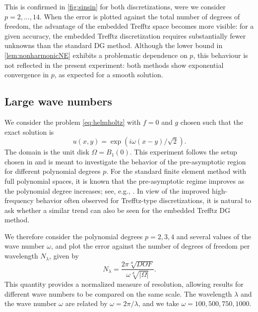 \documentclass[11pt]{article}
\theoremstyle{definition}
\theoremstyle{plain}
\begin{document}
This is confirmed in \cref{fig:sinsin} for both discretizations, were we consider $p=2,\ldots,14$.
When the error is plotted against the total number of degrees of freedom, the advantage of the embedded Trefftz space becomes more visible: for a given accuracy, the embedded Trefftz discretization requires substantially fewer unknowns than the standard DG method.
Although the lower bound in \cref{lem:nonharmonicNE} exhibits a problematic dependence on $p$, this behaviour is not reflected in the present experiment: both methods show exponential convergence in $p$, as expected for a smooth solution.


\subsection{Large wave numbers} \label{sec:largeo}
We consider the problem \eqref{eq:helmholtz} with $f=0$ and $g$ chosen such that the exact solution is 
\begin{equation}\label{eq:exp}
    u(x,y) = \exp(i\omega (x-y)/\sqrt{2}).
\end{equation}
The domain is the unit disk $\Omega = B_1(0)$.
This experiment follows the setup chosen in \cite{BM19} and is meant to investigate the behavior of the pre-asymptotic region for different polynomial degrees $p$.
For the standard finite element method with full polynomial spaces, it is known that the pre-asymptotic regime improves as the polynomial degree increases; see, e.g., \cite{MS11}.
In view of the improved high-frequency behavior often observed for Trefftz-type discretizations, it is natural to ask whether a similar trend can also be seen for the embedded Trefftz DG method.

We therefore consider the polynomial degrees $p=2,3,4$ and several values of the wave number $\omega$, and plot the error against the number of degrees of freedom per wavelength $N_\lambda$, given by
\[
N_\lambda = \frac{2\pi \sqrt[d]{DOF}}{\omega\sqrt[d]{|\Omega|}}.
\]
This quantity provides a normalized measure of resolution, allowing results for different wave numbers to be compared on the same scale.
The wavelength $\lambda$ and the wave number $\omega$ are related by $\omega=2\pi/\lambda$, and we take $\omega=100,500,750,1000$.
\end{document}
